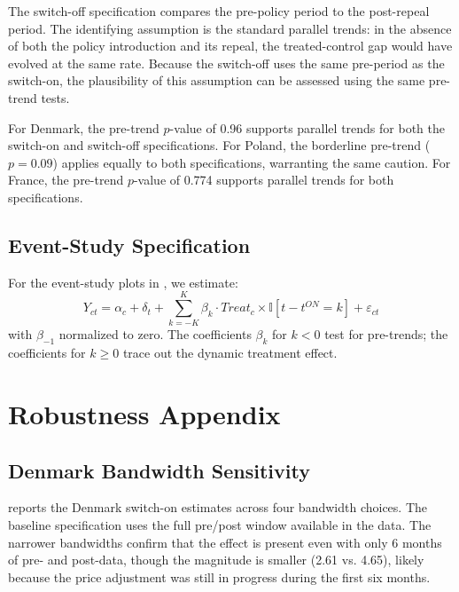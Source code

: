 \documentclass[12pt]{article}
\newcommand{\ind}{\mathbb{I}}
\begin{document}
The switch-off specification compares the pre-policy period to the post-repeal period. The identifying assumption is the standard parallel trends: in the absence of both the policy introduction and its repeal, the treated-control gap would have evolved at the same rate. Because the switch-off uses the same pre-period as the switch-on, the plausibility of this assumption can be assessed using the same pre-trend tests.

For Denmark, the pre-trend $p$-value of 0.96 supports parallel trends for both the switch-on and switch-off specifications. For Poland, the borderline pre-trend ($p = 0.09$) applies equally to both specifications, warranting the same caution. For France, the pre-trend $p$-value of 0.774 supports parallel trends for both specifications.

\subsection{Event-Study Specification}

For the event-study plots in , we estimate:
\begin{equation}
Y_{ct} = \alpha_c + \delta_t + \sum_{k = -K}^{K} \beta_k \cdot Treat_c \times \ind[t - t^{ON} = k] + \varepsilon_{ct}
\end{equation}
with $\beta_{-1}$ normalized to zero. The coefficients $\beta_k$ for $k < 0$ test for pre-trends; the coefficients for $k \geq 0$ trace out the dynamic treatment effect.


\section{Robustness Appendix}
\label{app:robustness}

\subsection{Denmark Bandwidth Sensitivity}

 reports the Denmark switch-on estimates across four bandwidth choices. The baseline specification uses the full pre/post window available in the data. The narrower bandwidths confirm that the effect is present even with only 6 months of pre- and post-data, though the magnitude is smaller (2.61 vs. 4.65), likely because the price adjustment was still in progress during the first six months.
\end{document}
